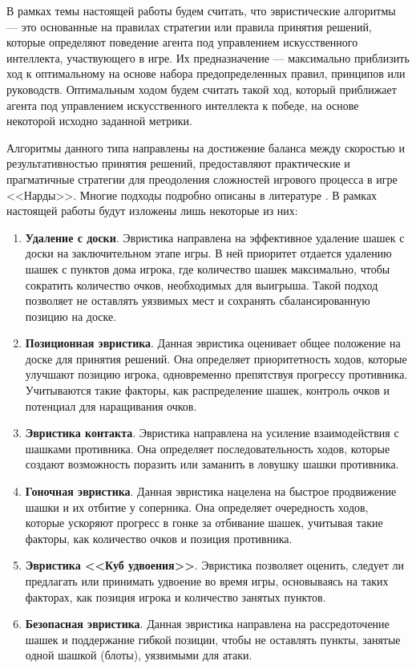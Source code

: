 В рамках темы настоящей работы будем считать, что эвристические алгоритмы --- это основанные на правилах стратегии или правила принятия решений, которые определяют поведение агента под управлением искусственного интеллекта, участвующего в игре. Их предназначение --- максимально приблизить ход к оптимальному на основе набора предопределенных правил, принципов или руководств. Оптимальным ходом будем считать такой ход, который приближает агента под управлением искусственного интеллекта к победе, на основе некоторой исходно заданной метрики.

Алгоритмы данного типа направлены на достижение баланса между скоростью и результативностью принятия решений, предоставляют практические и прагматичные стратегии для преодоления сложностей игрового процесса в игре <<Нарды>>. Многие подходы подробно описаны в литературе \cite{backgammon-strategies}. В рамках настоящей работы будут изложены лишь некоторые из них:

\begin{enumerate}
    \item \textbf{Удаление с доски}. Эвристика направлена на эффективное удаление шашек с доски на заключительном этапе игры. В ней приоритет отдается удалению шашек с пунктов дома игрока, где количество шашек максимально, чтобы сократить количество очков, необходимых для выигрыша. Такой подход позволяет не оставлять уязвимых мест и сохранять сбалансированную позицию на доске.
    \item \textbf{Позиционная эвристика}. Данная эвристика оценивает общее положение на доске для принятия решений. Она определяет приоритетность ходов, которые улучшают позицию игрока, одновременно препятствуя прогрессу противника. Учитываются такие факторы, как распределение шашек, контроль очков и потенциал для наращивания очков.
    \item \textbf{Эвристика контакта}. Эвристика направлена на усиление взаимодействия с шашками противника. Она определяет последовательность ходов, которые создают возможность поразить или заманить в ловушку шашки противника.
    \item \textbf{Гоночная эвристика}. Данная эвристика нацелена на быстрое продвижение шашки и их отбитие у соперника. Она определяет очередность ходов, которые ускоряют прогресс в гонке за отбивание шашек, учитывая такие факторы, как количество очков и позиция противника.
    \item \textbf{Эвристика <<Куб удвоения>>}. Эвристика позволяет оценить, следует ли предлагать или принимать удвоение во время игры, основываясь на таких факторах, как позиция игрока и количество занятых пунктов.
    \item \textbf{Безопасная эвристика}. Данная эвристика направлена на рассредоточение шашек и поддержание гибкой позиции, чтобы не оставлять пункты, занятые одной шашкой (блоты), уязвимыми для атаки.
\end{enumerate}
